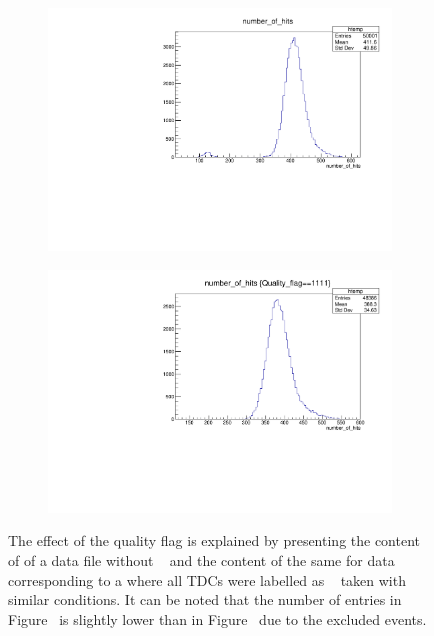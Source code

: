 	\begin{figure}[H]
        \begin{subfigure}{0.5\linewidth}
		    \centering
			\includegraphics[width = \linewidth]{fig/app1/No_Qflag_nhits_DAQ.pdf}
			\caption{\label{fig:qflag-daq:A}}
		\end{subfigure}
		\begin{subfigure}{0.5\linewidth}
		    \centering
			\includegraphics[width = \linewidth]{fig/app1/With_Qflag_nhits_DAQ.pdf}
			\caption{\label{fig:qflag-daq:B}}
		\end{subfigure}
		\caption{\label{fig:qflag-daq} The effect of the quality flag is explained by presenting the content of  of a data file without ~ and the content of the same  for data corresponding to a  where all TDCs were labelled as ~ taken with similar conditions. It can be noted that the number of entries in Figure~ is slightly lower than in Figure~ due to the excluded events.}
	\end{figure}
	
